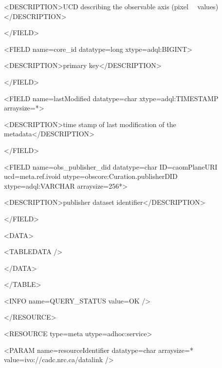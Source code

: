 \documentclass[11pt,a4paper]{ivoa}
\begin{document}
 {\textless}DESCRIPTION{\textgreater}UCD describing the observable axis (pixel
\ \ values){\textless}/DESCRIPTION{\textgreater}

{\textless}/FIELD{\textgreater}

{\textless}FIELD name={\textquotedbl}core\_id{\textquotedbl} datatype={\textquotedbl}long{\textquotedbl}
xtype={\textquotedbl}adql:BIGINT{\textquotedbl}{\textgreater}

 {\textless}DESCRIPTION{\textgreater}primary key{\textless}/DESCRIPTION{\textgreater}

{\textless}/FIELD{\textgreater}

{\textless}FIELD name={\textquotedbl}lastModified{\textquotedbl} datatype={\textquotedbl}char{\textquotedbl}
xtype={\textquotedbl}adql:TIMESTAMP{\textquotedbl} arraysize={\textquotedbl}*{\textquotedbl}{\textgreater}

 {\textless}DESCRIPTION{\textgreater}time stamp of last modification of the
metadata{\textless}/DESCRIPTION{\textgreater}

{\textless}/FIELD{\textgreater}

{\textless}FIELD name={\textquotedbl}obs\_publisher\_did{\textquotedbl} datatype={\textquotedbl}char{\textquotedbl}
ID={\textquotedbl}caomPlaneURI{\textquotedbl} ucd={\textquotedbl}meta.ref.ivoid{\textquotedbl}
utype={\textquotedbl}obscore:Curation.publisherDID{\textquotedbl} xtype={\textquotedbl}adql:VARCHAR{\textquotedbl}
arraysize={\textquotedbl}256*{\textquotedbl}{\textgreater}

 {\textless}DESCRIPTION{\textgreater}publisher dataset identifier{\textless}/DESCRIPTION{\textgreater}

{\textless}/FIELD{\textgreater}

{\textless}DATA{\textgreater}

 {\textless}TABLEDATA /{\textgreater}

{\textless}/DATA{\textgreater}

{\textless}/TABLE{\textgreater}

 {\textless}INFO name={\textquotedbl}QUERY\_STATUS{\textquotedbl} value={\textquotedbl}OK{\textquotedbl} /{\textgreater}

{\textless}/RESOURCE{\textgreater}

{\textless}RESOURCE type={\textquotedbl}meta{\textquotedbl}
utype={\textquotedbl}adhoc:service{\textquotedbl}{\textgreater}

 {\textless}PARAM name={\textquotedbl}resourceIdentifier{\textquotedbl} datatype={\textquotedbl}char{\textquotedbl}
arraysize={\textquotedbl}*{\textquotedbl} value={\textquotedbl}ivo://cadc.nrc.ca/datalink{\textquotedbl}
/{\textgreater}
\end{document}
